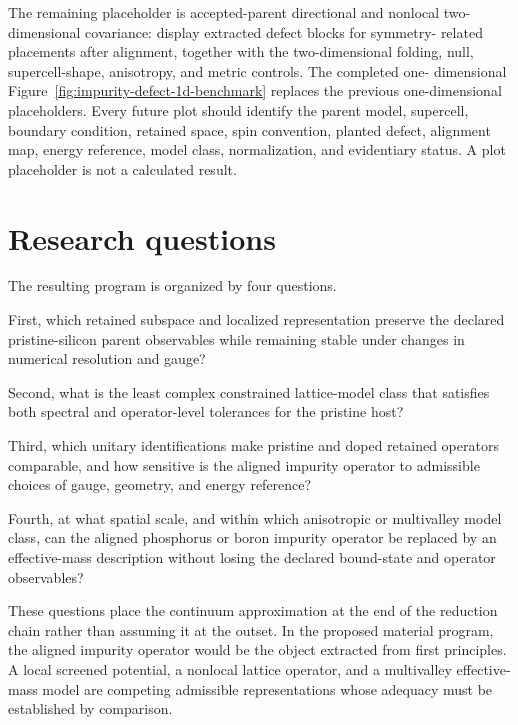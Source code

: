 The remaining placeholder is accepted-parent directional and nonlocal
two-dimensional covariance: display extracted defect blocks for symmetry-
related placements after alignment, together with the two-dimensional folding,
null, supercell-shape, anisotropy, and metric controls. The completed one-
dimensional Figure~\ref{fig:impurity-defect-1d-benchmark}
replaces the previous one-dimensional placeholders. Every future plot should
identify the parent model, supercell, boundary condition, retained space, spin
convention, planted defect, alignment map, energy reference, model class,
normalization, and evidentiary status. A plot placeholder is not a calculated
result.

\section{Research questions}

The resulting program is organized by four questions.

First, which retained subspace and localized representation preserve the
declared pristine-silicon parent observables while remaining stable under
changes in numerical resolution and gauge?

Second, what is the least complex constrained lattice-model class that
satisfies both spectral and operator-level tolerances for the pristine host?

Third, which unitary identifications make pristine and doped retained operators
comparable, and how sensitive is the aligned impurity operator to admissible
choices of gauge, geometry, and energy reference?

Fourth, at what spatial scale, and within which anisotropic or multivalley model
class, can the aligned phosphorus or boron impurity operator be replaced by an
effective-mass description without losing the declared bound-state and operator
observables?

These questions place the continuum approximation at the end of the reduction
chain rather than assuming it at the outset. In the proposed material program,
the aligned impurity operator would be the object extracted from first
principles. A local screened potential, a nonlocal lattice operator, and a
multivalley effective-mass model are competing admissible representations whose
adequacy must be established by comparison.
